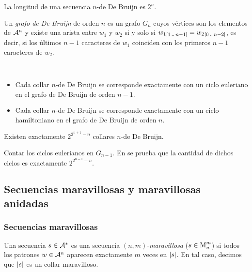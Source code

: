 \begin{obs}
  La longitud de una secuencia $n$-de De Bruijn es $2^n$.
\end{obs}

\begin{defi}
  Un \emph{grafo de De Bruijn} de orden $n$ es un grafo $G_n$ cuyos vértices
  son los elementos de $\mathcal{A}^n$ y existe una arista entre $w_1$ y $w_2$ si
  y solo si ${w_1}_{[1\,..\,n-1]} = {w_2}_{[0\,..\,n-2]}$, es decir, si los
  últimos $n-1$ caracteres de $w_1$ coinciden con los primeros $n-1$ caracteres
  de $w_2$.
\end{defi}

\begin{obs}\ %
  \begin{itemize}
    \item Cada collar $n$-de De Bruijn se corresponde exactamente con un ciclo
          euleriano en el grafo de De Bruijn de orden $n - 1$.
    \item Cada collar $n$-de De Bruijn se corresponde exactamente con un ciclo
          hamiltoniano en el grafo de De Bruijn de orden $n$.
  \end{itemize}
\end{obs}

\begin{prop}
  Existen exactamente $2^{2^{n+1} - n}$ collares $n$-de De Bruijn.
\end{prop}

\begin{demosketch}
  Contar los ciclos eulerianos en $G_{n-1}$.
  En \cite{db} se prueba que la cantidad de dichos ciclos es exactamente
  $2^{2^{n-1} - n}$.
\end{demosketch}

\subsection{Secuencias maravillosas y maravillosas anidadas}

\subsubsection{Secuencias maravillosas}

\begin{defi}
  Una secuencia $s \in \mathcal{A}^*$ es una secuencia $(n,m)$-\emph{maravillosa}
  ($s \in \text{M}_{n}^{m}$) si todos los patrones $w \in \mathcal{A}^n$ aparecen
  exactamente $m$ veces en $\left\vert s\right\vert$. En tal caso, decimos que $\left\vert s\right\vert$ es
  un collar maravilloso.
\end{defi}

